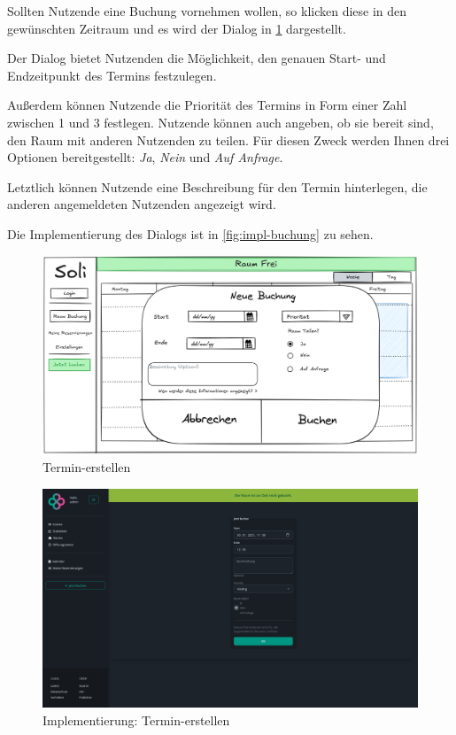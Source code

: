 Sollten Nutzende eine Buchung vornehmen wollen, so klicken diese in den gewünschten Zeitraum
und es wird der Dialog in \ref{fig:buchung} dargestellt.

Der Dialog bietet Nutzenden die Möglichkeit, den genauen Start- und Endzeitpunkt des Termins festzulegen.

Außerdem können Nutzende die Priorität des Termins in Form einer Zahl zwischen 1 und 3 festlegen.
Nutzende können auch angeben, ob sie bereit sind, den Raum mit anderen Nutzenden zu teilen.
Für diesen Zweck werden Ihnen drei Optionen bereitgestellt: \textit{Ja}, \textit{Nein} und \textit{Auf Anfrage}.

Letztlich können Nutzende eine Beschreibung für den Termin hinterlegen, die anderen angemeldeten Nutzenden angezeigt wird.

Die Implementierung des Dialogs ist in \ref{fig:impl-buchung} zu sehen.

\begin{figure}[ht]
    \centering
    \includegraphics[width=\textwidth]{figures/mockup/bookings_create_form}
    \caption{Termin-erstellen}
    \label{fig:buchung}
\end{figure}
\pagebreak

\begin{figure}[ht]
    \centering
    \includegraphics[width=\textwidth]{figures/impl-views/bookings_create_form}
    \caption{Implementierung: Termin-erstellen}
    \label{fig:implbuchung}
\end{figure}
\clearpage

